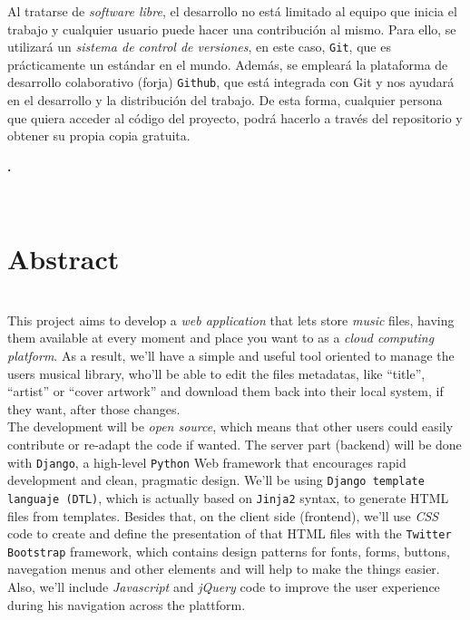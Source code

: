 Al tratarse de \textit{software libre}, el desarrollo no está limitado al equipo que inicia el trabajo y cualquier usuario puede hacer una contribución al mismo. Para ello, se utilizará un \textit{sistema de control de versiones}, en este caso, {\tt Git}, que es prácticamente un estándar en el mundo. Además, se empleará la plataforma de desarrollo colaborativo (forja) {\tt Github}, que está integrada con Git y nos ayudará en el desarrollo y la distribución del trabajo. De esta forma, cualquier persona que quiera acceder al código del proyecto, podrá hacerlo a través del repositorio y obtener su propia copia gratuita. \\


\newpage

\begin{center}
{\large\bfseries \myTitle. \mySubTitleENG}\\
\end{center}
\begin{center}
\myName\\
\end{center}

\section*{Abstract}

\bigskip
{} \\

This project aims to develop a \textit{web application} that lets store \textit{music} files, having them available at every moment and place you want to as a \textit{cloud computing platform}. As a result, we'll have a simple and useful tool oriented to manage the users musical library, who'll be able to edit the files metadatas, like ``title'', ``artist'' or ``cover artwork'' and download them back into their local system, if they want, after those changes. \\

The development will be \textit{open source}, which means that other users could easily contribute or re-adapt the code if wanted. The server part (backend) will be done with {\tt Django}, a high-level {\tt Python} Web framework that encourages rapid development and clean, pragmatic design. We'll be using {\tt Django template languaje (DTL)}, which is actually based on {\tt Jinja2} syntax, to generate HTML files from templates. Besides that, on the client side (frontend), we'll use \textit{CSS} code to create and define the presentation of that HTML files with the {\tt Twitter Bootstrap} framework, which contains design patterns for fonts, forms, buttons, navegation menus and other elements and will help to make the things easier. Also, we'll include \textit{Javascript} and \textit{jQuery} code to improve the user experience during his navigation across the plattform. \\

